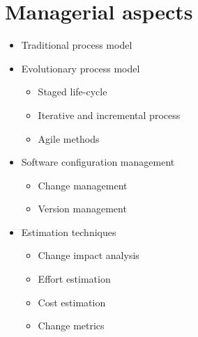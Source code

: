 \documentclass[a4paper,11pt]{report}
\begin{document}
\section{Managerial aspects}
	\begin{itemize}
		\item Traditional process model
		\item Evolutionary process model
			\begin{itemize}	
				\setlength{\itemsep}{0pt}		
				\setlength{\parskip}{0pt}		
				\setlength{\parsep}{0pt}	
				\item Staged life-cycle
				\item Iterative and incremental 
					process
				\item Agile methods
			\end{itemize}
		\item Software configuration management
			\begin{itemize}
				\setlength{\itemsep}{0pt}		
				\setlength{\parskip}{0pt}		
				\setlength{\parsep}{0pt}	
				\item Change management
				\item Version management
			\end{itemize}
		\item Estimation techniques
			\begin{itemize}	
				\setlength{\itemsep}{0pt}		
				\setlength{\parskip}{0pt}		
				\setlength{\parsep}{0pt}	
				\item Change impact analysis
				\item Effort estimation
				\item Cost estimation
				\item Change metrics
			\end{itemize}
	\end{itemize}
\end{document}
